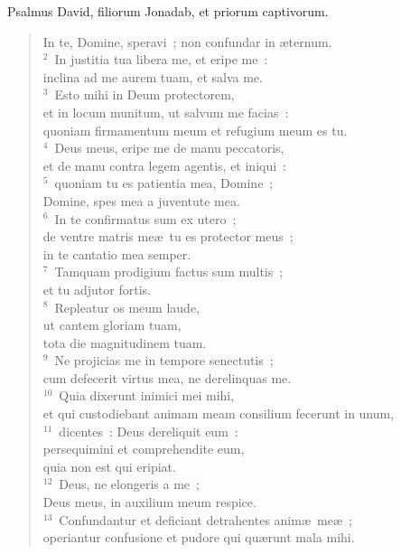 \bchapter
\lettrine[lines=3,image=true,loversize=0.05,lraise=-0.03]{P}{}salmus David, filiorum Jonadab, et priorum captivorum. \begin{flushleft}\begin{verse}\vspace{6pt}In te, Domine, speravi~; non confundar in \ae ternum.\\
${}^{2}$~In justitia tua libera me, et eripe me~:\\ inclina ad me aurem tuam, et salva me.\\
${}^{3}$~Esto mihi in Deum protectorem,\\ et in locum munitum, ut salvum me facias~:\\ quoniam firmamentum meum et refugium meum es tu.\\
${}^{4}$~Deus meus, eripe me de manu peccatoris,\\ et de manu contra legem agentis, et iniqui~:\\
${}^{5}$~quoniam tu es patientia mea, Domine~;\\ Domine, spes mea a juventute mea.\\
${}^{6}$~In te confirmatus sum ex utero~;\\ de ventre matris me\ae\ tu es protector meus~;\\ in te cantatio mea semper.\\
${}^{7}$~Tamquam prodigium factus sum multis~;\\ et tu adjutor fortis.\\
${}^{8}$~Repleatur os meum laude,\\ ut cantem gloriam tuam,\\ tota die magnitudinem tuam.\\
${}^{9}$~Ne projicias me in tempore senectutis~;\\ cum defecerit virtus mea, ne derelinquas me.\\
${}^{10}$~Quia dixerunt inimici mei mihi,\\ et qui custodiebant animam meam consilium fecerunt in unum,\\
${}^{11}$~dicentes~: Deus dereliquit eum~:\\ persequimini et comprehendite eum,\\ quia non est qui eripiat.\\
${}^{12}$~Deus, ne elongeris a me~;\\ Deus meus, in auxilium meum respice.\\
${}^{13}$~Confundantur et deficiant detrahentes anim\ae\ me\ae~;\\ operiantur confusione et pudore qui qu\ae runt mala mihi.\\

\end{verse}
\end{flushleft}
